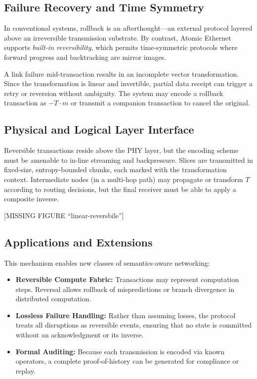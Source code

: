 \documentclass[../../../OAE-SPEC-MAIN.tex]{subfiles}
\begin{document}
\subsection{Failure Recovery and Time Symmetry}

In conventional systems, rollback is an afterthought—an external protocol layered above an irreversible transmission substrate. By contrast, Atomic Ethernet supports \emph{built-in reversibility}, which permits time-symmetric protocols where forward progress and backtracking are mirror images.

A link failure mid-transaction results in an incomplete vector transformation. Since the transformation is linear and invertible, partial data receipt can trigger a retry or reversion without ambiguity. The system may encode a rollback transaction as $-T \cdot m$ or transmit a companion transaction to cancel the original.

\subsection{Physical and Logical Layer Interface}

Reversible transactions reside above the PHY layer, but the encoding scheme must be amenable to in-line streaming and backpressure. Slices are transmitted in fixed-size, entropy-bounded chunks, each marked with the transformation context. Intermediate nodes (in a multi-hop path) may propagate or transform $T$ according to routing decisions, but the final receiver must be able to apply a composite inverse.

[MISSING FIGURE ``linear-reversbile'']

\subsection{Applications and Extensions}

This mechanism enables new classes of semantics-aware networking:

\begin{itemize}
  \item \textbf{Reversible Compute Fabric:} Transactions may represent computation steps. Reversal allows rollback of mispredictions or branch divergence in distributed computation.
  \item \textbf{Lossless Failure Handling:} Rather than assuming losses, the protocol treats all disruptions as reversible events, ensuring that no state is committed without an acknowledgment or its inverse.
  \item \textbf{Formal Auditing:} Because each transmission is encoded via known operators, a complete proof-of-history can be generated for compliance or replay.
\end{itemize}
\end{document}
